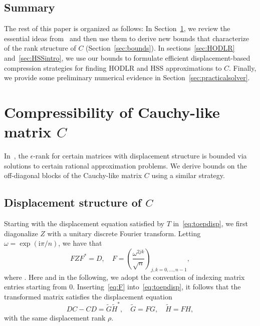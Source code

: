 \documentclass[final,reqno,onefignum,onetabnum]{siamart190516}
\newcommand{\iu}{\mathrm{i}}
\begin{document}
\subsection{Summary} The rest of this paper is organized as follows: 
In Section~\ref{sec:lowrankprop}, we review the essential ideas from~\cite{Beckermann2019} and then use them to derive new bounds that characterize of the rank structure of $C$ (Section~\ref{sec:bounds}). 
In sections~\ref{sec:HODLR} and~\ref{sec:HSSintro}, we use our bounds to formulate efficient displacement-based compression strategies for finding HODLR and HSS approximations to $C$. Finally, we provide some
preliminary numerical evidence in Section~\ref{sec:practicalsolver}. 

\section{Compressibility of Cauchy-like matrix $C$}
\label{sec:lowrankprop}

In~\cite{Beckermann2019}, the $\epsilon$-rank for certain matrices with displacement structure is bounded via solutions to certain rational approximation problems. We derive bounds on the off-diagonal blocks of the Cauchy-like matrix $C$ using a similar strategy. 
 
 \subsection{Displacement structure of $C$} 
 
 \label{sec:displacement}

 Starting with the displacement equation satisfied by $T$ in~\eqref{eq:toepdisp}, we first diagonalize $Z$ with a unitary discrete Fourier transform. Letting $\omega = \exp ( \iu \pi/n)$, we have that 
\begin{equation} 
\label{eq:F}
 FZF^* = D, \quad F = \left( \frac{\omega^{2jk}}{\sqrt{n}}\right)_{j, k = 0, \ldots, n-1}, 
\end{equation} 
where . Here and in the following, we adopt the convention of indexing matrix entries starting from 0. Inserting~\eqref{eq:F} into~\eqref{eq:toepdisp}, it follows that the transformed matrix  satisfies the displacement equation 
\begin{equation} 
\label{eq:cauchylike-disp}
D C - C D = \widetilde{G}\widetilde{H}^*, \quad \widetilde{G} = FG , \quad \widetilde{H} = F H ,
\end{equation}
with the same displacement rank $\rho$.
\end{document}
